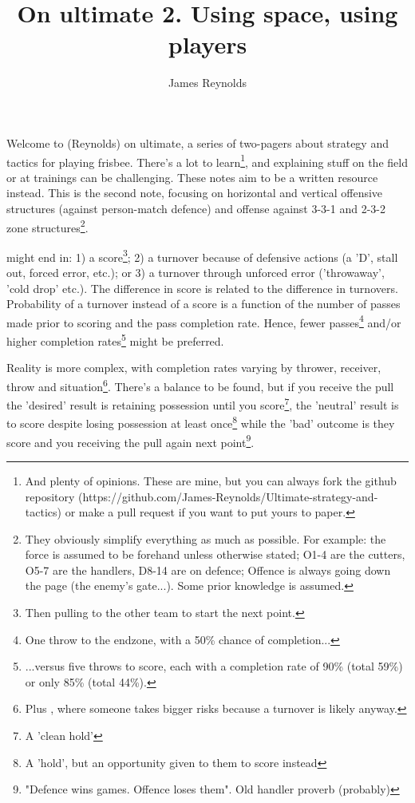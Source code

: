 \documentclass{tufte-handout}
\title{On ultimate 2. Using space, using players}
\author[James Reynolds]{James Reynolds}
\begin{document}
\maketitle%


Welcome to (Reynolds) on ultimate, 
a series of two-pagers 
about strategy and tactics for playing frisbee. 
There's a lot to learn\footnote{And plenty of opinions. 
These are mine, but you can always fork the github repository 
(https://github.com/James-Reynolds/Ultimate-strategy-and-tactics)
or make a pull request if you want to put yours to paper.}, 
and explaining stuff
on the field or at trainings
can be challenging.  
These notes 
aim to be a written resource 
instead. 
This is the second note, focusing on horizontal and vertical offensive structures 
(against person-match defence) 
and offense against 3-3-1 and 2-3-2 zone structures\footnote{They obviously simplify everything as much as possible.
For example: the force is assumed to be forehand unless otherwise stated;  
O1-4 are the cutters, O5-7 are the handlers, D8-14 are on defence; 
Offence is always going down the page (the enemy's gate...). Some prior knowledge is assumed.}. 



might end in: 
1) a score\footnote{Then pulling to the other team to start the next point.}; 
2) a turnover because of defensive actions (a 'D', stall out, forced error, etc.); or 
3) a turnover through unforced error ('throwaway', 'cold drop' etc.).
The difference in score
is related to the difference 
in turnovers.  
Probability of a turnover instead of a score 
is a function of 
the number of passes made 
prior to scoring 
and the pass completion rate.
Hence, fewer passes\footnote{
One throw to the endzone, with a 50\% chance of completion...} 
and/or higher completion rates\footnote{
...versus five throws
to score, 
each with a completion rate of 90\% 
(total 59\%) or only 85\%  
(total 44\%).}  
might be preferred. 

Reality is more complex, 
with
completion rates 
varying by 
thrower, 
receiver, 
throw 
and situation\footnote{Plus 
,  
where someone 
takes bigger risks 
because a turnover is 
likely anyway.}.
There's a balance 
to be found,
 but if you receive the pull 
 the 'desired' result is  
 retaining possession until you
 score\footnote{A 'clean hold'}, 
 the 'neutral' result is to score despite 
 losing possession at least once\footnote{A 'hold', but an opportunity given to them to score instead} while the 'bad' outcome  
 is they score and you receiving the pull again next point\footnote{"Defence wins games. Offence loses them". Old handler proverb (probably)}.
\end{document}
